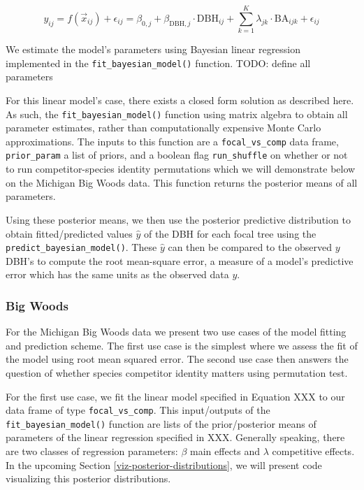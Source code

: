 \documentclass[12pt]{article}
\begin{document}
\[
\newcommand{\dbh}{\text{DBH}}
\newcommand{\biomass}{\text{biomass}}
\newcommand{\BA}{\text{BA}}
y_{ij} = f(\vec{x}_{ij}) + \epsilon_{ij} = \beta_{0,j} + \beta_{\dbh,j} \cdot \dbh_{ij} + \sum_{k=1}^{K} \lambda_{jk} \cdot \BA_{ijk} + \epsilon_{ij}
\]

We estimate the model's parameters using Bayesian linear regression
implemented in the \texttt{fit\_bayesian\_model()} function. TODO:
define all parameters

For this linear model's case, there exists a closed form solution as
described here. As such, the \texttt{fit\_bayesian\_model()} function
using matrix algebra to obtain all parameter estimates, rather than
computationally expensive Monte Carlo approximations. The inputs to this
function are a \texttt{focal\_vs\_comp} data frame,
\texttt{prior\_param} a list of priors, and a boolean flag
\texttt{run\_shuffle} on whether or not to run competitor-species
identity permutations which we will demonstrate below on the Michigan
Big Woods data. This function returns the posterior means of all
parameters.

Using these posterior means, we then use the posterior predictive
distribution to obtain fitted/predicted values \(\widehat{y}\) of the
DBH for each focal tree using the \texttt{predict\_bayesian\_model()}.
These \(\widehat{y}\) can then be compared to the observed \(y\) DBH's
to compute the root mean-square error, a measure of a model's predictive
error which has the same units as the observed data \(y\).

\hypertarget{big-woods}{%
\subsubsection{Big Woods}\label{big-woods}}

For the Michigan Big Woods data we present two use cases of the model
fitting and prediction scheme. The first use case is the simplest where
we assess the fit of the model using root mean squared error. The second
use case then answers the question of whether species competitor
identity matters using permutation test.

For the first use case, we fit the linear model specified in Equation
XXX to our data frame of type \texttt{focal\_vs\_comp}. This
input/outputs of the \texttt{fit\_bayesian\_model()} function are lists
of the prior/posterior means of parameters of the linear regression
specified in XXX. Generally speaking, there are two classes of
regression parameters: \(\beta\) main effects and \(\lambda\)
competitive effects. In the upcoming Section
\ref{viz-posterior-distributions}, we will present code visualizing this
posterior distributions.
\end{document}
